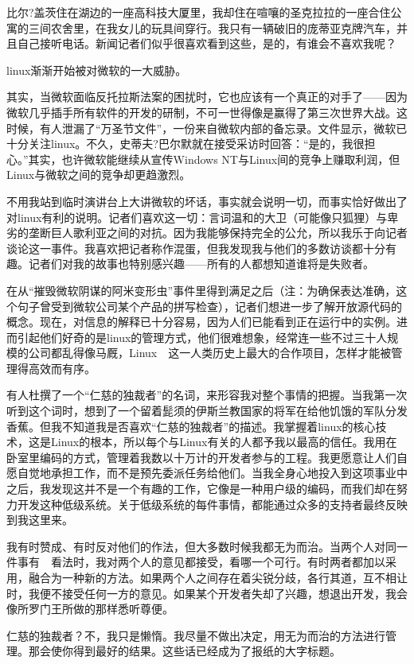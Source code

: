 比尔?盖茨住在湖边的一座高科技大厦里，我却住在喧嚷的圣克拉拉的一座合住公寓的三间农舍里，在我女儿的玩具间穿行。我只有一辆破旧的庞蒂亚克牌汽车，并且自己接听电话。新闻记者们似乎很喜欢看到这些，是的，有谁会不喜欢我呢？

linux渐渐开始被对微软的一大威胁。

其实，当微软面临反托拉斯法案的困扰时，它也应该有一个真正的对手了——因为微软几乎插手所有软件的开发的研制，不可一世得像是赢得了第三次世界大战。这时候，有人泄漏了“万圣节文件”，一份来自微软内部的备忘录。文件显示，微软已十分关注linux。不久，史蒂夫?巴尔默就在接受采访时回答：“是的，我很担心。”其实，也许微软能继续从宣传Windows NT与Linux间的竞争上赚取利润，但Linux与微软之间的竞争却更趋激烈。

不用我站到临时演讲台上大讲微软的坏话，事实就会说明一切，而事实恰好做出了对linux有利的说明。记者们喜欢这一切：言词温和的大卫（可能像只狐狸）与卑劣的垄断巨人歌利亚之间的对抗。因为我能够保持完全的公允，所以我乐于向记者谈论这一事件。我喜欢把记者称作混蛋，但我发现我与他们的多数访谈都十分有趣。记者们对我的故事也特别感兴趣——所有的人都想知道谁将是失败者。

在从“摧毁微软阴谋的阿米变形虫”事件里得到满足之后（注：为确保表达准确，这个句子曾受到微软公司某个产品的拼写检查），记者们想进一步了解开放源代码的概念。现在，对信息的解释已十分容易，因为人们已能看到正在运行中的实例。进而引起他们好奇的是linux的管理方式，他们很难想象，经常连一些不过三十人规模的公司都乱得像马厩，Linux　这一人类历史上最大的合作项目，怎样才能被管理得高效而有序。

有人杜撰了一个“仁慈的独裁者”的名词，来形容我对整个事情的把握。当我第一次听到这个词时，想到了一个留着髭须的伊斯兰教国家的将军在给他饥饿的军队分发香蕉。但我不知道我是否喜欢“仁慈的独裁者”的描述。我掌握着linux的核心技术，这是Linux的根本，所以每个与Linux有关的人都予我以最高的信任。我用在卧室里编码的方式，管理着我数以十万计的开发者参与的工程。我更愿意让人们自愿自觉地承担工作，而不是预先委派任务给他们。当我全身心地投入到这项事业中之后，我发现这并不是一个有趣的工作，它像是一种用户级的编码，而我们却在努力开发这种低级系统。关于低级系统的每件事情，都能通过众多的支持者最终反映到我这里来。

我有时赞成、有时反对他们的作法，但大多数时候我都无为而治。当两个人对同一件事有　看法时，我对两个人的意见都接受，看哪一个可行。有时两者都加以采用，融合为一种新的方法。如果两个人之间存在着尖锐分歧，各行其道，互不相让时，我便不接受任何一方的意见。如果某个开发者失却了兴趣，想退出开发，我会像所罗门王所做的那样悉听尊便。

仁慈的独裁者？不，我只是懒惰。我尽量不做出决定，用无为而治的方法进行管理。那会使你得到最好的结果。这些话已经成为了报纸的大字标题。

